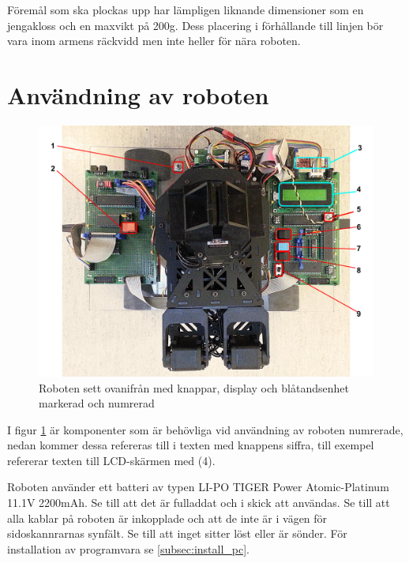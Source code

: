 \documentclass[a4paper,12pt]{article}
\begin{document}
Föremål som ska plockas upp har lämpligen liknande dimensioner som en jengakloss och en maxvikt på 200g. Dess placering i förhållande till linjen bör vara inom armens räckvidd men inte heller för nära roboten. 

%
%

\section{Användning av roboten}
\begin{figure}[H]
	\centering
	\includegraphics[width=1.0\textwidth]{oversikt_handledning.pdf}
	\caption{Roboten sett ovanifrån med knappar, display och blåtandsenhet markerad och numrerad}
	\label{fig:robot_oversikt}
\end{figure}

I figur \ref{fig:robot_oversikt} är komponenter som är behövliga vid användning av roboten numrerade, nedan kommer dessa refereras till i texten med knappens siffra, till exempel refererar texten till LCD-skärmen med (4).

Roboten använder ett batteri av typen LI-PO TIGER Power Atomic-Platinum 11.1V 2200mAh. Se till att det är fulladdat och i skick att användas. Se till att alla kablar på roboten är inkopplade och att de inte är i vägen för sidoskannrarnas synfält. Se till att inget sitter löst eller är sönder. För installation av programvara se \ref{subsec:install_pc}.
\end{document}

